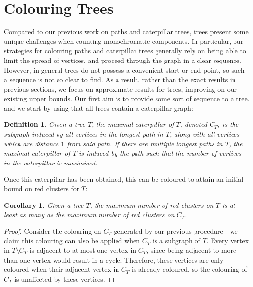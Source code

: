 \documentclass{mpaper}
\newtheorem{definition}{Definition}[section]
\newtheorem{corollary}{Corollary}[section]
\begin{document}
\section{Colouring Trees}
\label{sec/trees}

Compared to our previous work on paths and caterpillar trees, trees present some unique challenges when counting monochromatic components. In particular, our strategies for colouring paths and caterpillar trees generally rely on being able to limit the spread of vertices, and proceed through the graph in a clear sequence. However, in general trees do not possess a convenient start or end point, so such a sequence is not so clear to find. As a result, rather than the exact results in previous sections, we focus on approximate results for trees, improving on our existing upper bounds. Our first aim is to provide some sort of sequence to a tree, and we start by using that all trees contain a caterpillar graph:

\begin{definition}
  \label{def/maximal-caterpillar}
  Given a tree $T$, the \emph{maximal caterpillar of $T$}, denoted $C_T$, is the subgraph induced by all vertices in the longest path in $T$, along with all vertices which are distance $1$ from said path. If there are multiple longest paths in $T$, the maximal caterpillar of $T$ is induced by the path such that the number of vertices in the caterpillar is maximised.
\end{definition}

Once this caterpillar has been obtained, this can be coloured to attain an initial bound on red clusters for $T$:

\begin{corollary}
  \label{cor/tree-caterpillar}
  Given a tree $T$, the maximum number of red clusters on $T$ is at least as many as the maximum number of red clusters on $C_T$.
\end{corollary}

\begin{proof}
  Consider the colouring on $C_T$ generated by our previous procedure - we claim this colouring can also be applied when $C_T$ is a subgraph of $T$. Every vertex in $T \setminus C_T$ is adjacent to at most one vertex in $C_T$, since being adjacent to more than one vertex would result in a cycle. Therefore, these vertices are only coloured when their adjacent vertex in $C_T$ is already coloured, so the colouring of $C_T$ is unaffected by these vertices.
\end{proof}
\end{document}
